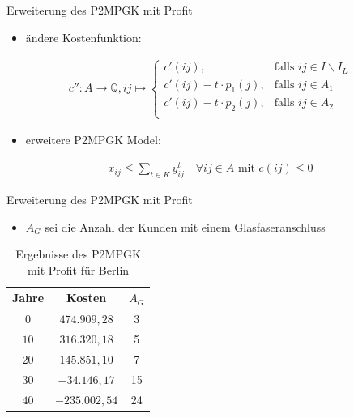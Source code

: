 \documentclass{beamer}
\newcommand{\Q}{\mathbb{Q}}
\begin{document}
		\begin{frame}{Erweiterung des P2MPGK mit Profit}
			\begin{itemize}
				\item ändere Kostenfunktion:
			\end{itemize}
		\begin{align*}
			c'': A  \rightarrow \Q,  ij  \mapsto \left\{\begin{array}{cl} 
			c'(ij), & \text{falls } ij \in I\backslash I_L \\ 
			c'(ij) -t  \cdot p_1(j), & \text{falls } ij \in A_1 \\ 
			c'(ij) -t \cdot p_2(j), & \text{falls } ij \in  A_2 \\ 
		\end{array}  \right.
		\end{align*}
			\begin{itemize}
				\item erweitere P2MPGK Model:
			\end{itemize}
			\begin{align*}
			x_{ij} \leq \displaystyle\sum_{t \in K} y_{ij}^t \quad \forall ij \in A \text{ mit } c(ij) \leq 0
			\end{align*}
		\end{frame}

\begin{frame}{Erweiterung des P2MPGK mit Profit}
			\begin{itemize}
				\item $A_G$ sei die Anzahl der Kunden mit einem Glasfaseranschluss
			\end{itemize}
	\begin{table}[!htbp]
		\centering
		\begin{tabular}{c|c|c}
			\centering
			Jahre & Kosten & $A_G$ \\	
			\hline
			$0$   	 &  \(474.909,28\) & 3  \\
			$10$ 	&  \(316.320,18\) & 5  \\
			$20$   	&   \(145.851,10\) & 7  \\
			$30$    &   $ -34.146,17$	& 15  \\
			$40$    & $-235.002,54$ &  24 \\
		\end{tabular}
		\caption{Ergebnisse des P2MPGK mit Profit f\"ur Berlin}
	\end{table}
\end{frame}
\end{document}
